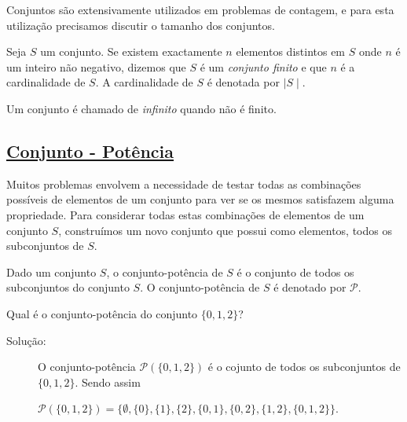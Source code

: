 Conjuntos são extensivamente utilizados em problemas de contagem, e para esta
utilização precisamos discutir o tamanho dos conjuntos.

\begin{defn}
\label{def34}
Seja $S$ um conjunto. Se existem exactamente $n$ elementos distintos em $S$ onde
$n$ é um inteiro não negativo, dizemos que $S$ é um \emph{conjunto finito} e que
$n$ é a cardinalidade de $S$. A cardinalidade de $S$ é denotada por $\mid
S \mid$.
\end{defn}

\begin{defn}
\label{def35}
Um conjunto é chamado de \emph{infinito} quando não é finito.
\end{defn}

\subsection*{\underline{Conjunto - Potência}}
Muitos problemas envolvem a necessidade de testar todas as combinações possíveis
de elementos de um conjunto para ver se os mesmos satisfazem alguma propriedade.
Para considerar todas estas combinações de elementos de um conjunto $S$,
construímos um novo conjunto que possui como elementos, todos os subconjuntos de
$S$.

\begin{defn}
\label{def36}
Dado um conjunto $S$, o conjunto-potência de $S$ é o conjunto de todos os
subconjuntos do conjunto $S$. O conjunto-potência de $S$ é denotado por
$\mathcal{P}$.
\end{defn}

\begin{exmp}
\label{exem38}
Qual é o conjunto-potência do conjunto $\{0,1,2\}$?

\begin{description}
\item[Solução:] O conjunto-potência $\mathcal{P}(\{0,1,2\})$ é o cojunto de
todos os subconjuntos de $\{0,1,2\}$. Sendo assim
\begin{center}
$\mathcal{P}(\{0,1,2\}) = \{\emptyset, \{0\}, \{1\}, \{2\}, \{0,1\}, \{0,2\},
\{1,2\}, \{0,1,2\}\}$.
\end{center}
\end{description}

\end{exmp}



